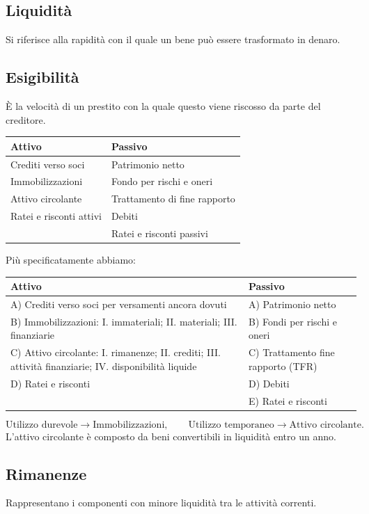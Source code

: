 \documentclass[11pt,a4paper]{article}
\newcommand{\orig}[1]{\clearpage}
\begin{document}
\subsection*{Liquidità}
Si riferisce alla rapidità con il quale un bene può essere trasformato in denaro.
\subsection*{Esigibilità}
È la velocità di un prestito con la quale questo viene riscosso da parte del creditore.
\begin{center}\begin{tabular}{p{.43\linewidth}|p{.43\linewidth}}
\textbf{Attivo}&\textbf{Passivo}\\\hline
Crediti verso soci&Patrimonio netto\\
Immobilizzazioni&Fondo per rischi e oneri\\
Attivo circolante&Trattamento di fine rapporto\\
Ratei e risconti attivi&Debiti\\
&Ratei e risconti passivi
\end{tabular}\end{center}
\orig{25}
Più specificatamente abbiamo:
\begin{center}\begin{tabular}{p{.45\linewidth}|p{.45\linewidth}}
\textbf{Attivo}&\textbf{Passivo}\\\hline
A) Crediti verso soci per versamenti ancora dovuti&A) Patrimonio netto\\
B) Immobilizzazioni: I. immateriali; II. materiali; III. finanziarie&B) Fondi per rischi e oneri\\
C) Attivo circolante: I. rimanenze; II. crediti; III. attività finanziarie; IV. disponibilità liquide&C) Trattamento fine rapporto (TFR)\\
D) Ratei e risconti&D) Debiti\\
&E) Ratei e risconti
\end{tabular}\end{center}
\[\text{Utilizzo durevole}\longrightarrow\text{Immobilizzazioni},\qquad
\text{Utilizzo temporaneo}\longrightarrow\text{Attivo circolante}.\]
L'attivo circolante è composto da beni convertibili in liquidità entro un anno.
\orig{26}\subsection*{Rimanenze}
Rappresentano i componenti con minore liquidità tra le attività correnti.
\end{document}
